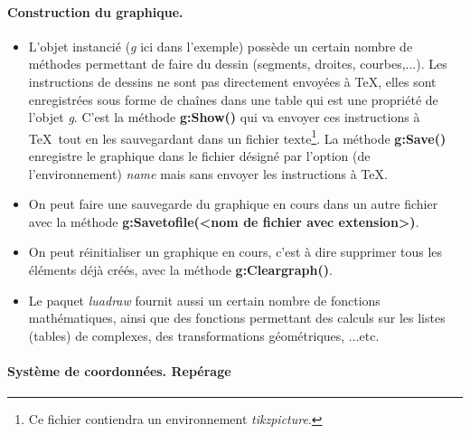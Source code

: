 \paragraph{Construction du graphique.}

\begin{itemize}
    \item L'objet instancié (\emph{g} ici dans l'exemple) possède un certain nombre de méthodes permettant de faire du dessin (segments, droites, courbes,...). Les instructions de dessins ne sont pas directement envoyées à \TeX, elles sont enregistrées sous forme de chaînes dans une table qui est une propriété de l'objet \emph{g}. C'est la méthode \textbf{g:Show()} qui va envoyer ces instructions à \TeX\ tout en les sauvegardant dans un fichier texte\footnote{Ce fichier contiendra un environnement \emph{tikzpicture}.}. La méthode \textbf{g:Save()} enregistre le graphique dans le fichier désigné par l'option (de l'environnement) \emph{name} mais sans envoyer les instructions à \TeX.
    \item On peut faire une sauvegarde du graphique en cours dans un autre fichier avec la méthode \textbf{g:Savetofile(<nom de fichier avec extension>)}.
    \item On peut réinitialiser un graphique en cours, c'est à dire supprimer tous les éléments déjà créés, avec la méthode \textbf{g:Cleargraph()}.
    \item Le paquet \emph{luadraw} fournit aussi un certain nombre de fonctions mathématiques, ainsi que des fonctions permettant des calculs sur les listes (tables) de complexes, des transformations géométriques, ...etc.
\end{itemize}


\paragraph{Système de coordonnées. Repérage}

